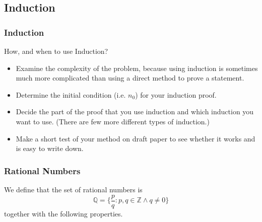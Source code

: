 \documentclass[12pt, t]{beamer}
\begin{document}
\subsection{Induction}
\begin{frame}
    \frametitle{Induction}
    How, and when to use Induction? 
    \begin{itemize}
        \item Examine the complexity of the problem, because using induction is sometimes much more
            complicated than using a direct method to prove a statement.
        \item Determine the initial condition (i.e. $n_0$) for your induction proof.
        \item Decide the part of the proof that you use induction and which induction you want to use.
            (There are few more different types of induction.)
        \item Make a short test of your method on draft paper to see whether it works and is easy to write down.
    \end{itemize}
\end{frame}

\begin{frame}
    \frametitle{Rational Numbers}
    We define that the set of rational numbers is 
    \begin{equation*}
        \mathbb{Q}=\{\frac{p}{q}:p,q\in \mathbb{Z}\wedge q \neq 0\}
    \end{equation*}
    together with the following properties.
    \begin{table}
        \centering
    \end{table}
\end{frame}    
\end{document}
